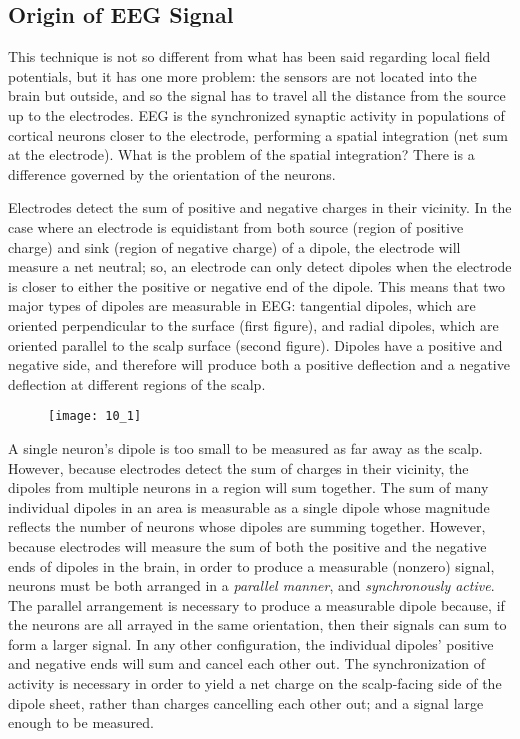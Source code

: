 \subsection{Origin of EEG Signal}
This technique is not so different from what has been said regarding local field potentials, but it has one more problem: the sensors 
are not located into the brain but outside, and so the signal has to travel all the distance from the source up to the electrodes.
EEG is the synchronized synaptic activity in populations of cortical neurons closer to the electrode, performing a spatial integration 
(net sum at the electrode).
What is the problem of the spatial integration? There is a difference governed by the orientation of the neurons.
\par\medskip
Electrodes detect the sum of positive and negative charges in their vicinity. In the case where an electrode is equidistant from
both source (region of positive charge) and sink (region of negative charge) of a dipole, the electrode will measure a net
neutral; so, an electrode can only detect dipoles when the electrode is closer to either the positive or negative end of the dipole. 
This means that two major types of dipoles are measurable in EEG: tangential dipoles, which are oriented perpendicular to
the surface (first figure), and radial dipoles, which are oriented parallel to the scalp surface (second figure). Dipoles have a 
positive and negative side, and therefore will produce both a positive deflection and a negative deflection at different regions of the scalp.
\begin{figure}[H]
    \texttt{[image: 10\_1]}
    \centering
\end{figure}
A single neuron's dipole is too small to be measured as far away as the scalp. However, because electrodes detect the sum of charges
in their vicinity, the dipoles from multiple neurons in a region will sum together. The sum of many individual dipoles in an area is
measurable as a single dipole whose magnitude reflects the number of neurons whose dipoles are summing together. However, because electrodes 
will measure the sum of both the positive and the negative ends of dipoles in the brain, in order to produce a measurable (nonzero) signal, 
neurons must be both arranged in a \textit{parallel manner}, and \textit{synchronously active}. The parallel arrangement is necessary to produce a measurable 
dipole because, if the neurons are all arrayed in the same orientation, then their signals can sum to form a larger signal. 
In any other configuration, the individual dipoles' positive and negative ends will sum and cancel each other out. The synchronization 
of activity is necessary in order to yield a net charge on the scalp-facing side of the dipole sheet, rather than charges cancelling each other out; 
and a signal large enough to be measured.

